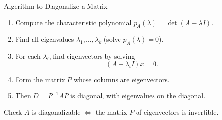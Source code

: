 \documentclass[aspectratio=169]{beamer}
\begin{document}
\begin{frame}{Algorithm to Diagonalize a Matrix}

\begin{enumerate}
  \item Compute the characteristic polynomial $p_A(\lambda) = \det(A - \lambda I)$.
  \item Find all eigenvalues $\lambda_1,\ldots,\lambda_k$ (solve $p_A(\lambda)=0$).
  \item For each $\lambda_i$, find eigenvectors by solving
  \[
  (A - \lambda_i I)x = 0.
  \]
  \item Form the matrix $P$ whose columns are eigenvectors.
  \item Then $D = P^{-1} A P$ is diagonal, with eigenvalues on the diagonal.
\end{enumerate}

\pause
\begin{block}{Check}
$A$ is diagonalizable $\Leftrightarrow$ the matrix $P$ of eigenvectors is invertible.
\end{block}

\end{frame}
\end{document}
